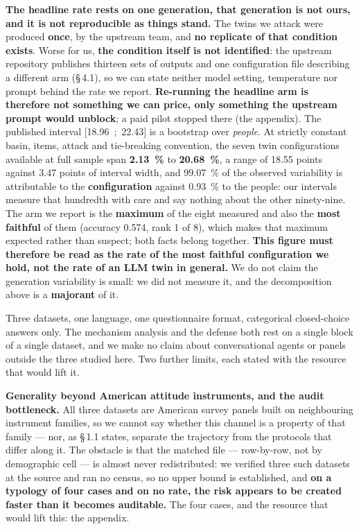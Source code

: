 \documentclass[sigconf,anonymous,review]{acmart}
\begin{document}
\textbf{The headline rate rests on one generation, that generation is not ours, and it is not reproducible as things stand.} The twins we attack were produced \textbf{once}, by the upstream team, and \textbf{no replicate of that condition exists}. Worse for us, \textbf{the condition itself is not identified}: the upstream repository publishes thirteen sets of outputs and one configuration file describing a different arm (\S\,4.1), so we can state neither model setting, temperature nor prompt behind the rate we report. \textbf{Re-running the headline arm is therefore not something we can price, only something the upstream prompt would unblock}; a paid pilot stopped there (the appendix). The published interval [18.96~;~22.43] is a bootstrap over \textit{people}. At strictly constant basin, items, attack and tie-breaking convention, the seven twin configurations available at full sample span \textbf{2.13~\%} to \textbf{20.68~\%}, a range of 18.55 points against 3.47 points of interval width, and 99.07~\% of the observed variability is attributable to the \textbf{configuration} against 0.93~\% to the people: our intervals measure that hundredth with care and say nothing about the other ninety-nine. The arm we report is the \textbf{maximum} of the eight measured and also the \textbf{most faithful} of them (accuracy 0.574, rank 1 of 8), which makes that maximum expected rather than suspect; both facts belong together. \textbf{This figure must therefore be read as the rate of the most faithful configuration we hold, not the rate of an LLM twin in general.} We do not claim the generation variability is small: we did not measure it, and the decomposition above is a \textbf{majorant} of it.

Three datasets, one language, one questionnaire format, categorical closed-choice answers only. The mechanism analysis and the defense both rest on a single block of a single dataset, and we make no claim about conversational agents or panels outside the three studied here. Two further limits, each stated with the resource that would lift it.

\textbf{Generality beyond American attitude instruments, and the audit bottleneck.} All three datasets are American survey panels built on neighbouring instrument families, so we cannot say whether this channel is a property of that family --- nor, as \S\,1.1 states, separate the trajectory from the protocols that differ along it. The obstacle is that the matched file --- row-by-row, not by demographic cell --- is almost never redistributed: we verified three such datasets at the source and ran no census, so no upper bound is established, and \textbf{on a typology of four cases and on no rate, the risk appears to be created faster than it becomes auditable.} The four cases, and the resource that would lift this: the appendix.
\end{document}
